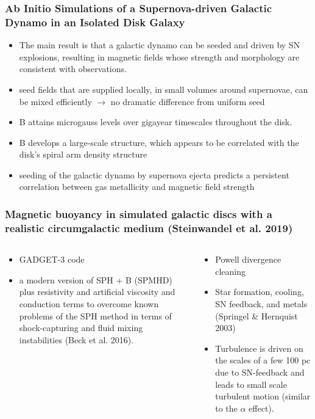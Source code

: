 \documentclass[10pt,aspectratio=169]{beamer}
\begin{document}
\begin{frame}
	\frametitle{Ab Initio Simulations of a Supernova-driven Galactic Dynamo in an Isolated Disk Galaxy \citep{2017ApJ...843..113B}}
	\begin{itemize}
		\item The main result is that a galactic dynamo can be seeded and driven by SN explosions, resulting in magnetic fields whose strength and morphology are consistent with observations.
		\item seed fields that are supplied locally, in small volumes around supernovae, can be mixed efficiently $\rightarrow$ no dramatic difference from uniform seed
		\item B attains microgauss levels over gigayear timescales throughout the disk.
		\item B develops a large-scale structure, which appears to be correlated with the disk’s spiral arm density structure
		\item seeding of the galactic dynamo by supernova ejecta predicts a persistent correlation between gas metallicity and magnetic field strength
	\end{itemize}
\end{frame}
\begin{frame}
	\frametitle{Magnetic buoyancy in simulated galactic discs with a realistic circumgalactic medium (Steinwandel et al. 2019)}
		\begin{columns}
			\begin{column}{0.48\textwidth}
				\begin{itemize}
					\item GADGET-3 code
					\item a modern version of SPH + B (SPMHD) plus resistivity and artificial viscosity and conduction terms to overcome known problems of the SPH method in terms of shock-capturing and fluid mixing instabilities (Beck et al. 2016).
				\end{itemize}
			\end{column}
			\begin{column}{0.48\textwidth}
					\begin{itemize}
						\item Powell divergence cleaning
						\item Star formation, cooling, SN feedback, and metals (Springel \& Hernquist 2003)
						\item Turbulence is driven on the scales of a few 100 pc due to SN-feedback and leads to small scale turbulent motion (similar to the $\alpha$ effect).
					\end{itemize}
			\end{column}
		\end{columns}
\end{frame}
\end{document}
